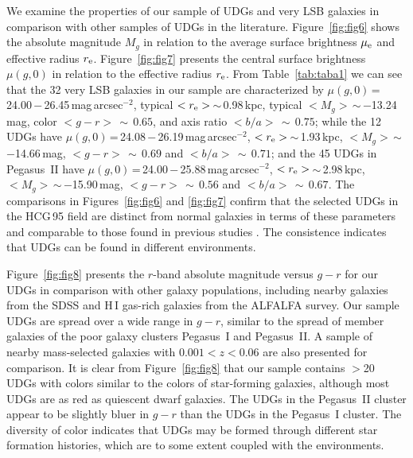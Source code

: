 \documentclass[twocolumn,trackchanges]{aastex61}
\begin{document}
We examine the properties of our sample of UDGs and very LSB galaxies in comparison with other samples of UDGs in the literature. Figure~\ref{fig:fig6} shows the absolute magnitude $M_{g}$ in relation to the average surface brightness $\mu_{\rm e}$  and effective radius $r_{\rm e}$.   Figure~\ref{fig:fig7} presents the central surface brightness $\mu{(g,0)}$ in relation to the effective radius $r_{\rm e}$. 
From Table~\ref{tab:taba1} we can see that the 32 very LSB galaxies in our sample are characterized by $\mu(g,0)$\,=\,24.00\,$-$\,26.45\,mag\,arcsec$^{-2}$, typical $<r_{\rm e}>$\,$\sim$\,0.98\,kpc, typical $<M_{g}>$\,$\sim$\,$-$13.24\,mag, color $<g-r>\,\sim\,0.65$, and axis ratio $<b/a>\,\sim\,0.75$; while the 12 UDGs have $\mu(g,0)$\,=\,24.08\,$-$\,26.19\,mag\,arcsec$^{-2}$, $<r_{\rm e}>$\,$\sim$\,1.93\,kpc, $<M_{g}>$\,$\sim$\,$-$14.66\,mag, $<g-r>\,\sim\,0.69$ and $<b/a>\,\sim\,0.71$;  and the 45 UDGs in Pegasus~II have $\mu(g,0)$\,=\,24.00\,$-$\,25.88\,mag\,arcsec$^{-2}$, $<r_{\rm e}>$\,$\sim$\,2.98\,kpc, $<M_{g}>$\,$\sim$\,$-$15.90\,mag, $<g-r>\,\sim\,0.56$ and $<b/a>\,\sim\,0.67$. 
%
The comparisons in Figures~\ref{fig:fig6} and \ref{fig:fig7} confirm that the selected UDGs in the HCG\,95 field are distinct from normal galaxies in terms of these parameters and comparable to those found in previous studies \citep[e.g.,][]{vanderBurg2016}.  The consistence indicates that UDGs can be found in different environments. 
%


Figure~\ref{fig:fig8} presents the $r$-band absolute magnitude versus $g-r$ for our UDGs in comparison with other galaxy populations, including nearby galaxies from the SDSS and H\,{\small I} gas-rich galaxies from the ALFALFA survey. Our sample UDGs are spread over a wide range in $g-r$, similar to the spread of member galaxies of the poor galaxy clusters Pegasus~I and Pegasus~II. A sample of nearby mass-selected galaxies with $0.001<z<0.06$ are also presented for comparison. It is clear from Figure~\ref{fig:fig8} that our sample contains  $>$20 UDGs with colors similar to the colors of star-forming galaxies, although most UDGs are as red as quiescent dwarf galaxies.  The UDGs in the Pegasus~II cluster appear to be slightly bluer in $g-r$ than the UDGs in the Pegasus~I cluster. The diversity of color indicates that UDGs may be formed through different star formation histories, which are to some extent coupled with the environments.  
\end{document}
